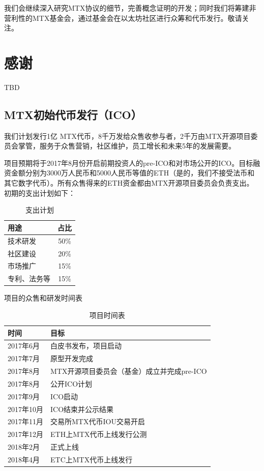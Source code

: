 \documentclass[UTF8,nofonts]{ctexart}
\begin{document}
我们会继续深入研究MTX协议的细节，完善概念证明的开发；同时我们将筹建非营利性的MTX基金会，通过基金会在以太坊社区进行众筹和代币发行。敬请关注。

\section{感谢\label{sec:acknowledgement}}

TBD

\newpage



\newpage
\begin{appendices}
\section{MTX初始代币发行（ICO）\label{sec:ico}}

我们计划发行1亿 MTX代币，8千万发给众售收参与者，2千万由MTX开源项目委员会掌管，服务于众售营销，社区维护，员工增长和未来5年的发展需要。

项目预期将于2017年8月份开启前期投资人的pre-ICO和对市场公开的ICO。目标融资金额分别为3000万人民币和5000人民币等值的ETH（是的，我们不接受法币和其它数字代币）。所有众售得来的ETH资金都由MTX开源项目委员会负责支出。初期的支出计划如下：

\begin{table}[hbt]
  \centering
  \begin{tabular}{l|c}
 用途   & 占比\\
    \hline
  技术研发 & 50\% \\
  社区建设 & 20\% \\
  市场推广 & 15\% \\
  专利、法务等 & 15\% \\
  \end{tabular}
  \caption{支出计划}
\end{table}


项目的众售和研发时间表
\begin{table}[hbt]
  \centering
  \begin{tabular}{l|l}
 时间   & 目标\\
    \hline
  2017年6月 & 白皮书发布，项目启动 \\
  2017年7月 & 原型开发完成 \\
  2017年8月 & MTX开源项目委员会（基金）成立并完成pre-ICO \\
  2017年8月 & 公开ICO计划 \\
  2017年9月 & ICO启动 \\
  2017年10月 & ICO结束并公示结果 \\
  2017年11月 & 交易所MTX代币IOU交易开启 \\
  2017年12月 & ETH上MTX代币上线发行公测 \\
  2018年2月 & 正式上线 \\
  2018年4月 & ETC上MTX代币上线发行 \\
  \end{tabular}
  \caption{项目时间表}
\end{table}


\end{appendices}
\end{document}
